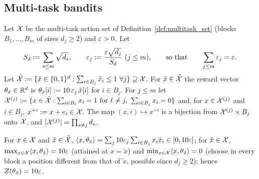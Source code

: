 \subsection{Multi-task bandits}
\label{sec:log_gains_lower_multitask}

\begin{definition}\label{def:multitask_instances}
\leanok
{}
Let $\mathcal{X}$ be the multi-task action set of Definition~\ref{def:multitask_set} (blocks
$B_1,\dots,B_m$ of sizes $d_j \ge 2$) and $\varepsilon > 0$. Let
\[
  S_d := \sum_{s\le m}\sqrt{d_s}, \qquad \varepsilon_j := \frac{\varepsilon\sqrt{d_j}}{S_d}\ (j\le m),
  \qquad\text{so that}\qquad \sum_{j\le m}\varepsilon_j = \varepsilon .
\]
Let $\tilde{\mathcal{X}} := \{\tilde x \in \{0,1\}^d : \sum_{i\in B_j}\tilde x_i \le 1\ \forall j\} \supseteq \mathcal{X}$.
For $\tilde x \in \tilde{\mathcal{X}}$ the reward vector $\theta_{\tilde x} \in \mathbb{R}^d$ is
$\theta_{\tilde x}[i] := 10\,\varepsilon_j\,\tilde x[i]$ for $i \in B_j$. For $j \le m$ let
$\mathcal{X}^{(j)} := \{x \in \tilde{\mathcal{X}} : \sum_{i\in B_\ell}x_i = 1 \text{ for } \ell\ne j,\ \sum_{i\in B_j}x_i = 0\}$
and, for $x \in \mathcal{X}^{(j)}$ and $i \in B_j$, $x^{+i} := x + e_i \in \mathcal{X}$. The map
$(x, i) \mapsto x^{+i}$ is a bijection from $\mathcal{X}^{(j)}\times B_j$ onto $\mathcal{X}$, and
$\lvert \mathcal{X}^{(j)} \rvert = \prod_{s\ne j}d_s$.

For $x \in \mathcal{X}$ and $\tilde x \in \tilde{\mathcal{X}}$,
$\langle x, \theta_{\tilde x} \rangle = \sum_{j}10\varepsilon_j\sum_{i\in B_j}x_i\tilde x_i \in [0, 10\varepsilon]$; for
$\tilde x \in \mathcal{X}$, $\max_{x\in\mathcal{X}}\langle x, \theta_{\tilde x} \rangle = 10\varepsilon$ (attained at
$x = \tilde x$) and $\min_{x\in\mathcal{X}}\langle x, \theta_{\tilde x} \rangle = 0$ (choose in every block a
position different from that of $\tilde x$, possible since $d_j \ge 2$); hence
$Z(\theta_{\tilde x}) = 10\varepsilon$.
\end{definition}

